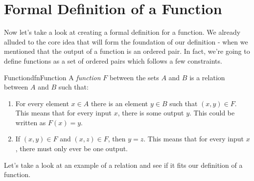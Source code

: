 \section{Formal Definition of a Function}

Now let's take a look at creating a formal definition for a function. We already alluded to the core idea that will form the foundation of our definition - when we mentioned that the output of a function is an ordered pair. In fact, we're going to define functions as a set of ordered pairs which follows a few constraints.

\begin{dfn}[label={def:function}]{Function}{dfnFunction}
    A \emph{function} $F$ between the sets $A$ and $B$ is a relation between $A$ and $B$ such that:
    \begin{enumerate}
        \item For every element $x \in A$ there is an element $y \in B$ such that $(x,y) \in F$. This means that for every input $x$, there is some output $y$. This could be written as $F(x) = y$.
        \item If $(x,y) \in F$ and $(x,z) \in F$, then $y = z$. This means that for every input $x$, there must only ever be one output.
    \end{enumerate}
\end{dfn}

Let's take a look at an example of a relation and see if it fits our definition of a function.

